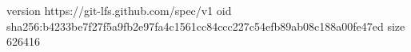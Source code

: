 version https://git-lfs.github.com/spec/v1
oid sha256:b4233be7f27f5a9fb2e97fa4c1561cc84ccc227c54efb89ab08c188a00fe47ed
size 626416
